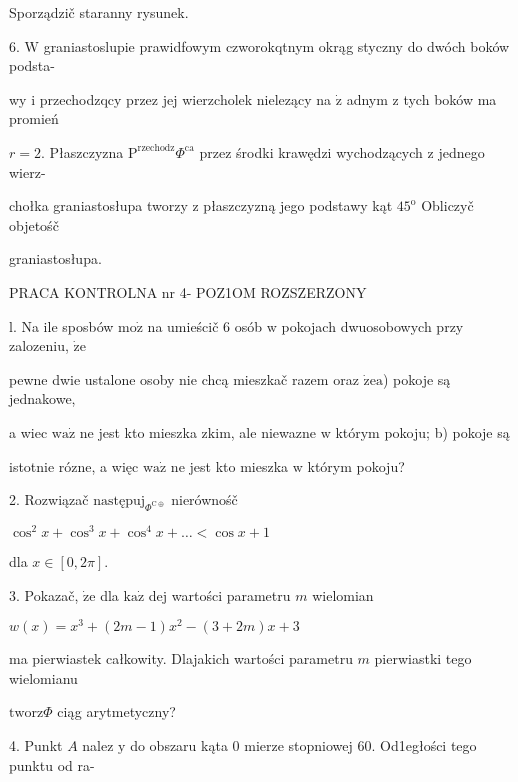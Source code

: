 \documentclass[a4paper,12pt]{article}
\begin{document}
Sporządzič staranny rysunek.

6. $\mathrm{W}$ graniastoslupie prawidfowym czworokqtnym okrąg styczny do dwóch boków podsta-

wy $\mathrm{i}$ przechodzqcy przez jej wierzcholek nielezący na $\dot{\mathrm{z}}$ adnym $\mathrm{z}$ tych boków ma promień

$r=2$. Płaszczyzna $\mathrm{P}^{\mathrm{r}\mathrm{z}\mathrm{e}\mathrm{c}\mathrm{h}\mathrm{o}\mathrm{d}\mathrm{z}}\Phi^{\mathrm{c}\mathrm{a}}$ przez środki krawędzi wychodzących $\mathrm{z}$ jednego wierz-

chołka graniastosłupa tworzy $\mathrm{z}$ płaszczyzną jego podstawy kąt $45^{\mathrm{o}}$ Obliczyč objetośč

graniastosłupa.




PRACA KONTROLNA nr 4- POZ1OM ROZSZERZONY

l. Na ile sposbów $\mathrm{m}\mathrm{o}\dot{\mathrm{z}}$ na umieścič 6 osób $\mathrm{w}$ pokojach dwuosobowych przy zalozeniu, $\dot{\mathrm{z}}\mathrm{e}$

pewne dwie ustalone osoby nie chcą mieszkač razem oraz $\dot{\mathrm{z}}\mathrm{e} \mathrm{a}$) pokoje są jednakowe,

a wiec $\mathrm{w}\mathrm{a}\dot{\mathrm{z}}$ ne jest kto mieszka $\mathrm{z} \mathrm{k}\mathrm{i}\mathrm{m}$, ale niewazne $\mathrm{w}$ którym pokoju; b) pokoje są

istotnie rózne, a więc $\mathrm{w}\mathrm{a}\dot{\mathrm{z}}$ ne jest kto mieszka $\mathrm{w}$ którym pokoju?

2. Rozwiązač $\mathrm{n}\mathrm{a}\mathrm{s}\mathrm{t}\text{ę} \mathrm{p}\mathrm{u}\mathrm{j}_{\Phi^{\mathrm{C}\oplus}}$ nierównośč

$\cos^{2}x+\cos^{3}x+\cos^{4}x+\ldots<\cos x+1$

dla $x\in[0,2\pi].$

3. Pokazač, $\dot{\mathrm{z}}\mathrm{e}$ dla $\mathrm{k}\mathrm{a}\dot{\mathrm{z}}$ dej wartości parametru $m$ wielomian

$w(x)=x^{3}+(2m-1)x^{2}-(3+2m)x+3$

ma pierwiastek całkowity. Dlajakich wartości parametru $m$ pierwiastki tego wielomianu

$\mathrm{t}\mathrm{w}\mathrm{o}\mathrm{r}\mathrm{z}\Phi$ ciąg arytmetyczny?

4. Punkt $A$ nalez $\mathrm{y}$ do obszaru kąta $0$ mierze stopniowej 60. Od1egłości tego punktu od ra-
\end{document}
